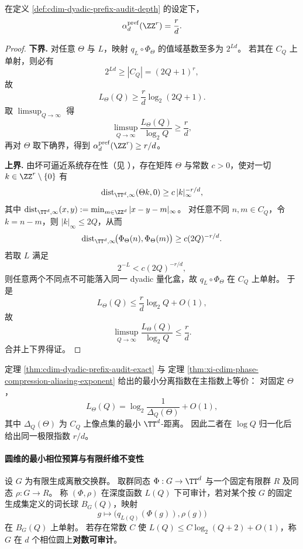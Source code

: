 \begin{theorem}[相位审计指数的精确值]\label{thm:cdim-dyadic-prefix-audit-exact}
在定义 \ref{def:cdim-dyadic-prefix-audit-depth} 的设定下，
\[
\alpha_{d}^{\mathrm{pref}}(\ZZ^r)=\frac{r}{d}.
\]
\end{theorem}
\begin{proof}
\textbf{下界.}
对任意 \(\Theta\) 与 \(L\)，映射 \(q_L\circ\Phi_{\Theta}\) 的值域基数至多为 \(2^{Ld}\)。
若其在 \(C_Q\) 上单射，则必有
\[
2^{Ld}\ge |C_Q|=(2Q+1)^r,
\]
故
\[
L_{\Theta}(Q)\ge \frac{r}{d}\log_2(2Q+1).
\]
取 \(\limsup_{Q\to\infty}\) 得
\[
\limsup_{Q\to\infty}\frac{L_{\Theta}(Q)}{\log_2 Q}\ge \frac{r}{d},
\]
再对 \(\Theta\) 取下确界，得到
\(
\alpha_{d}^{\mathrm{pref}}(\ZZ^r)\ge r/d
\)。
\par
\textbf{上界.}
由坏可逼近系统存在性（见 \cite{Schmidt1969BadlyApproximableSystems}），存在矩阵 \(\Theta\) 与常数 \(c>0\)，使对一切 \(k\in\ZZ^r\setminus\{0\}\) 有
\[
\operatorname{dist}_{\TT^d,\infty}(\Theta k,0)\ge c\,|k|_{\infty}^{-r/d},
\]
其中
\(
\operatorname{dist}_{\TT^d,\infty}(x,y):=\min_{m\in\ZZ^d}|x-y-m|_{\infty}
\)。
对任意不同 \(n,m\in C_Q\)，令 \(k=n-m\)，则 \(|k|_{\infty}\le 2Q\)，从而
\[
\operatorname{dist}_{\TT^d,\infty}\!\bigl(\Phi_{\Theta}(n),\Phi_{\Theta}(m)\bigr)
\ge c(2Q)^{-r/d}.
\]
若取 \(L\) 满足
\[
2^{-L}<c(2Q)^{-r/d},
\]
则任意两个不同点不可能落入同一 dyadic 量化盒，故 \(q_L\circ\Phi_{\Theta}\) 在 \(C_Q\) 上单射。
于是
\[
L_{\Theta}(Q)\le \frac{r}{d}\log_2 Q+O(1),
\]
故
\[
\limsup_{Q\to\infty}\frac{L_{\Theta}(Q)}{\log_2 Q}\le \frac{r}{d}.
\]
合并上下界得证。
\end{proof}

\begin{remark}[与最小分离指数口径的一致性]\label{rem:cdim-dyadic-prefix-vs-separation}
定理 \ref{thm:cdim-dyadic-prefix-audit-exact} 与
定理 \ref{thm:xi-cdim-phase-compression-aliasing-exponent}
给出的最小分离指数在主指数上等价：
对固定 \(\Theta\)，
\[
L_{\Theta}(Q)=\log_2\!\frac{1}{\Delta_Q(\Theta)}+O(1),
\]
其中 \(\Delta_Q(\Theta)\) 为 \(C_Q\) 上像点集的最小 \(\TT^d\)-距离。
因此二者在 \(\log Q\) 归一化后给出同一极限指数 \(r/d\)。
\end{remark}

\paragraph{圆维的最小相位预算与有限纤维不变性}
\begin{definition}[带固定有限外置寄存器的对数可审计]\label{def:cdim-log-auditable-with-finite-register}
设 \(G\) 为有限生成离散交换群。
取群同态
\(
\Phi:G\to\TT^d
\)
与一个固定有限群 \(R\) 及同态
\(
\rho:G\to R
\)。
称 \((\Phi,\rho)\) 在深度函数 \(L(Q)\) 下可审计，若对某个按 \(G\) 的固定生成集定义的词长球 \(B_G(Q)\)，映射
\[
g\longmapsto \bigl(q_{L(Q)}(\Phi(g)),\rho(g)\bigr)
\]
在 \(B_G(Q)\) 上单射。
若存在常数 \(C\) 使 \(L(Q)\le C\log_2(Q+2)+O(1)\)，称 \(G\) 在 \(d\) 个相位圆上\textbf{对数可审计}。
\end{definition}

